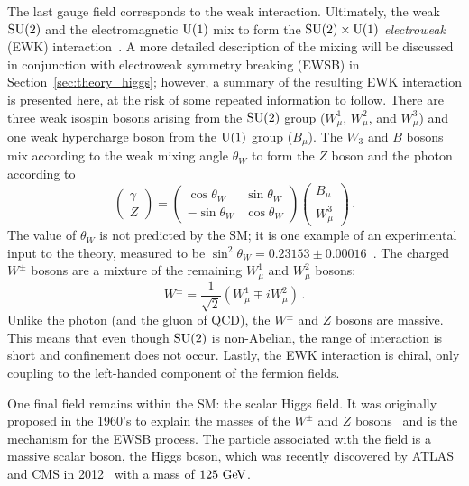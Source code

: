 The last gauge field corresponds to the weak interaction.
Ultimately, the weak $\textrm{SU}(2)$ and the electromagnetic $\textrm{U}(1)$ mix to form the $\textrm{SU}(2)\times\textrm{U}(1)$ \emph{electroweak} (EWK) interaction~\cite{1959.Salam.electroweak, 1959.Glashow.vector-mesons}.
A more detailed description of the mixing will be discussed in conjunction with electroweak symmetry breaking (EWSB) in Section~\ref{sec:theory_higgs}; however, a summary of the resulting EWK interaction is presented here, at the risk of some repeated information to follow.
There are three weak isospin bosons arising from the $\textrm{SU}(2)$ group ($W_{\mu}^1$, $W_{\mu}^2$, and $W_{\mu}^3$) and one weak hypercharge boson from the $\textrm{U}(1)$ group ($B_{\mu}$).
The $W_3$ and $B$ bosons mix according to the weak mixing angle $\theta_W$ to form the $Z$ boson and the photon according to
\begin{equation}
  \begin{pmatrix}
  \gamma\\
  Z
  \end{pmatrix}
  = 
  \begin{pmatrix}
  \cos{\theta_W} & \sin{\theta_W} \\
  -\sin{\theta_W} & \cos{\theta_W}
  \end{pmatrix}
  \begin{pmatrix}
  B_{\mu} \\
  W_{\mu}^3
  \end{pmatrix}\,.
  \label{eq:weak_mixing}
\end{equation}
The value of $\theta_W$ is not predicted by the SM; it is one example of an experimental input to the theory, measured to be $\sin^2{\theta_W} = 0.23153\pm0.00016$~\cite{2006.weak-mixing}.
The charged $W^{\pm}$ bosons are a mixture of the remaining $W_{\mu}^1$ and $W_{\mu}^2$ bosons:
\begin{equation}
  W^{\pm} = \frac{1}{\sqrt{2}}(W_{\mu}^1 \mp iW_{\mu}^2)\,.
  \label{eq:w_mixing}
\end{equation}
Unlike the photon (and the gluon of QCD), the $W^\pm$ and $Z$ bosons are massive.
This means that even though $\textrm{SU}(2)$ is non-Abelian, the range of interaction is short and confinement does not occur.
Lastly, the EWK interaction is chiral, only coupling to the left-handed component of the fermion fields.

One final field remains within the SM: the scalar Higgs field.
It was originally proposed in the 1960's to explain the masses of the $W^{\pm}$ and $Z$ bosons~\cite{1964.Englert.symmetry_breaking, 1964.Higgs.Broken_Symmetries_1, 1964.Higgs.Broken_Symmetries_2} and is the mechanism for the EWSB process.
The particle associated with the field is a massive scalar boson, the Higgs boson, which was recently discovered by ATLAS and CMS in 2012~\cite{HIGG-2012-27, CMS-HIG-12-028} with a mass of $125\gev$.


